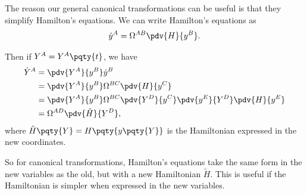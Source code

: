 The reason our general canonical transformations can be useful is that they simplify Hamilton's equations. We can write Hamilton's equations as
\begin{equation}
    \dot{y}^A = \Omega^{AB} \pdv{H}{y^B}.
\end{equation}

Then if \(Y^A = Y^A\pqty{t}\), we have
\begin{subequations}
    \begin{align}
        \dot{Y}^A &= \pdv{Y^A}{y^B} \dot{y}^B \\
        &= \pdv{Y^A}{y^B} \Omega^{BC} \pdv{H}{y^C} \\
        &= \pdv{Y^A}{y^B} \Omega^{BC} \pdv{Y^D}{y^C} \pdv{y^E}{Y^D} \pdv{H}{y^E} \\
        &= \Omega^{AD} \pdv{\tilde{H}}{Y^D},
    \end{align}
\end{subequations}
where \(\tilde{H}\pqty{Y} = H\pqty{y\pqty{Y}}\) is the Hamiltonian expressed in the new coordinates.

So for canonical transformations, Hamilton's equations take the same form in the new variables as the old, but with a new Hamiltonian \(\tilde{H}\). This is useful if the Hamiltonian is simpler when expressed in the new variables.

